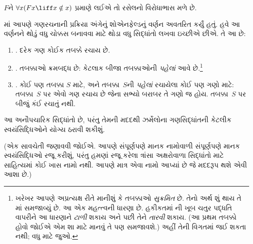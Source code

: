 $F$ને $\forall x(Fx \liff x \notin x)$ પ્રમાણે લઈએ તો રસેલનો
વિરોધાભાસ મળે છે.
\endgroup


\OLEndChapterHook
\endgroup

\begingroup
\makeatletter{}\makeatother

\label{guunit:OLP-0537}


\begingroup
\makeatletter{}\makeatother

\label{guunit:OLP-0538}


માં આપણે ગણરચનાની પ્રક્રિયા અંગેનું
શોએનફેલ્ડનું વર્ણન અવતરિત કર્યું હતું. હવે આ વર્ણનને થોડું વધુ
ચોક્કસ બનાવવા માટે થોડા વધુ સિદ્ધાંતો લખવા ઇચ્છીએ છીએ. તે આ છે:
\begin{enumerate}
\item[] \stageshier. દરેક ગણ કોઈક તબક્કે રચાય છે.
\item[] \stagesord. તબક્કાઓ ક્રમબદ્ધ છે: કેટલાક બીજા તબક્કાઓની
\emph{પહેલાં} આવે છે.\footnote{ખરેખર આપણે અપ્રત્યક્ષ રીતે
માનીશું કે તબક્કાઓ \emph{સુક્રમિત} છે. તેનો અર્થ શું થાય તે
માં સમજાવ્યું છે. આ એક મહત્ત્વની ધારણા છે.
હકીકતમાં \citet{Scott1974}ની ખૂબ ચતુર પદ્ધતિ વાપરીને આ ધારણાને
\emph{ટાળી} શકાય અને પછી તેને \emph{તારવી} શકાય. (આ પ્રથમ તબક્કો
હોવો જોઈએ એમ શા માટે માનવું તે પણ સમજાવશે.) અહીં તેની વિગતમાં
જઈ શકતા નથી; વધુ માટે \citet{ButtonLT1} જુઓ.}
\item[] \stagesacc. કોઈ પણ તબક્કા $S$ માટે, અને તબક્કા~$S$ની
\emph{પહેલાં} રચાયેલા કોઈ પણ ગણો માટે: તબક્કા~$S$ પર એવો ગણ
રચાય છે જેના સભ્યો બરાબર તે ગણો જ હોય. તબક્કા~$S$ પર બીજું
કંઈ રચાતું નથી.
\end{enumerate}
આ અનૌપચારિક સિદ્ધાંતો છે, પરંતુ તેમની મદદથી ઝર્મેલોના
ગણસિદ્ધાંતની કેટલીક સ્વયંસિદ્ધિઓને યોગ્ય ઠરાવી શકીશું.

(એક સાવચેતી જણાવવી જોઈએ. આપણે સંપૂર્ણપણે માનક નામોવાળી
સંપૂર્ણપણે માનક સ્વયંસિદ્ધિઓ રજૂ કરીશું, પરંતુ હમણાં રજૂ કરેલા
ત્રાંસા અક્ષરોવાળા સિદ્ધાંતો માટે સાહિત્યમાં કોઈ ખાસ નામો નથી.
આપણે માત્ર એવા નામો આપ્યાં છે જે મદદરૂપ થશે એવી આશા છે.)
\endgroup

\begingroup
\makeatletter{}\makeatother

\label{guunit:OLP-0539}


